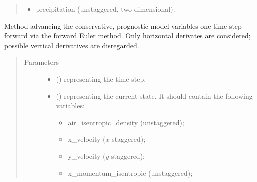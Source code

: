 \documentclass[letterpaper,10pt,english]{sphinxmanual}
\begin{document}
\begin{fulllineitems}
\begin{fulllineitems}
\begin{quote}
\begin{description}
\begin{itemize}
\begin{itemize}
\item {} 
precipitation (unstaggered, two-dimensional).

\end{itemize}

\end{itemize}


\end{description}\end{quote}

\end{fulllineitems}


\begin{fulllineitems}
\label{\detokenize{api:tasmania.dycore.prognostic_isentropic_forward_euler.PrognosticIsentropicForwardEuler.step_neglecting_vertical_advection}}
Method advancing the conservative, prognostic model variables one time step forward
via the forward Euler method. Only horizontal derivates are considered; possible vertical
derivatives are disregarded.
\begin{quote}\begin{description}
\item[{Parameters}] \leavevmode\begin{itemize}
\item {} 
 () \textendash{}  representing the time step.

\item {} 
 () \textendash{} 
{\hyperref[\detokenize{api:tasmania.storages.state_isentropic.StateIsentropic}]{}} representing the current state.
It should contain the following variables:
\begin{itemize}
\item {} 
air\_isentropic\_density (unstaggered);

\item {} 
x\_velocity (\(x\)-staggered);

\item {} 
y\_velocity (\(y\)-staggered);

\item {} 
x\_momentum\_isentropic (unstaggered);


\end{itemize}
\end{itemize}
\end{description}
\end{quote}
\end{fulllineitems}
\end{fulllineitems}
\end{document}
